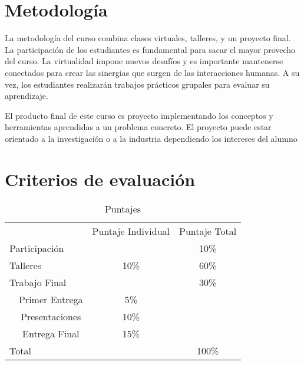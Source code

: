 \documentclass[11pt]{article}
\begin{document}
\pagebreak






\section{Metodología}
La metodología del curso combina clases virtuales, talleres, y un proyecto final. La participación de los estudiantes es fundamental para sacar el mayor provecho del curso. La virtualidad impone nuevos desafíos y es importante mantenerse conectados para crear las sinergias que surgen de las interacciones humanas. A su vez, los estudiantes realizarán trabajos prácticos grupales para evaluar su aprendizaje. 

El producto final de este curso es proyecto implementando los conceptos y herramientas aprendidas a un problema concreto. El proyecto puede estar orientado a la investigación o a la industria dependiendo los intereses del alumno





\section{Criterios de evaluación} \label{sec:evaluacion}

\begin{table}[H]
\centering
\caption{Puntajes}
\scriptsize
\begin{tabular}{lccc}
\hline
 \hline
\multicolumn{2}{l}{}                       & Puntaje Individual & Puntaje Total \\
\multicolumn{2}{l}{Participación}          &                    & 10\%          \\
\multicolumn{2}{l}{Talleres}               & 10\%               & 60\%          \\
\multicolumn{2}{l}{Trabajo Final} 		   &                    & 30\%          \\
              & Primer Entrega             & 5\%                &               \\
              & Presentaciones             & 10\%               &               \\
               & Entrega Final            & 15\%               &               \\
\multicolumn{2}{l}{Total}                  &                    & 100\%        \\
\hline
 \hline
\end{tabular}
\end{table}
\end{document}
